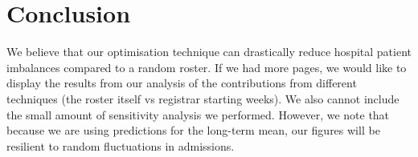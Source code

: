 \documentclass[a4paper]{article}
\begin{document}
\section{Conclusion}

We believe that our optimisation technique can drastically reduce hospital patient imbalances compared to a random roster. If we had more pages, we would like to display the results from our analysis of the contributions from different techniques (the roster itself vs registrar starting weeks). We also cannot include the small amount of sensitivity analysis we performed. However, we note that because we are using predictions for the long-term mean, our figures will be resilient to random fluctuations in admissions.
\end{document}
